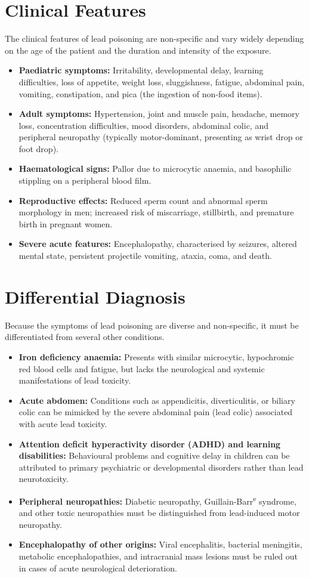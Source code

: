 \section*{Clinical Features}
The clinical features of lead poisoning are non-specific and vary widely depending on the age of the patient and the duration and intensity of the exposure.
\begin{itemize}
    \item \textbf{Paediatric symptoms:} Irritability, developmental delay, learning difficulties, loss of appetite, weight loss, sluggishness, fatigue, abdominal pain, vomiting, constipation, and pica (the ingestion of non-food items).
    \item \textbf{Adult symptoms:} Hypertension, joint and muscle pain, headache, memory loss, concentration difficulties, mood disorders, abdominal colic, and peripheral neuropathy (typically motor-dominant, presenting as wrist drop or foot drop).
    \item \textbf{Haematological signs:} Pallor due to microcytic anaemia, and basophilic stippling on a peripheral blood film.
    \item \textbf{Reproductive effects:} Reduced sperm count and abnormal sperm morphology in men; increased risk of miscarriage, stillbirth, and premature birth in pregnant women.
    \item \textbf{Severe acute features:} Encephalopathy, characterised by seizures, altered mental state, persistent projectile vomiting, ataxia, coma, and death.
\end{itemize}

\section*{Differential Diagnosis}
Because the symptoms of lead poisoning are diverse and non-specific, it must be differentiated from several other conditions.
\begin{itemize}
    \item \textbf{Iron deficiency anaemia:} Presents with similar microcytic, hypochromic red blood cells and fatigue, but lacks the neurological and systemic manifestations of lead toxicity.
    \item \textbf{Acute abdomen:} Conditions such as appendicitis, diverticulitis, or biliary colic can be mimicked by the severe abdominal pain (lead colic) associated with acute lead toxicity.
    \item \textbf{Attention deficit hyperactivity disorder (ADHD) and learning disabilities:} Behavioural problems and cognitive delay in children can be attributed to primary psychiatric or developmental disorders rather than lead neurotoxicity.
    \item \textbf{Peripheral neuropathies:} Diabetic neuropathy, Guillain-Barr\textsuperscript{e} syndrome, and other toxic neuropathies must be distinguished from lead-induced motor neuropathy.
    \item \textbf{Encephalopathy of other origins:} Viral encephalitis, bacterial meningitis, metabolic encephalopathies, and intracranial mass lesions must be ruled out in cases of acute neurological deterioration.
\end{itemize}

